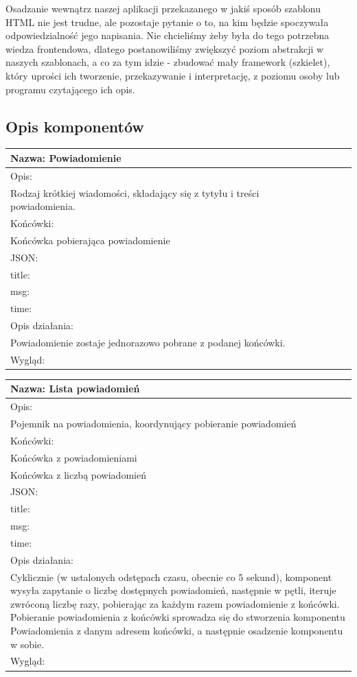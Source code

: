 \documentclass[licencjacka]{pracamgr}
\begin{document}
Osadzanie wewnątrz naszej aplikacji przekazanego w jakiś sposób szablonu HTML nie jest trudne, ale pozostaje pytanie o to,
na kim będzie spoczywała odpowiedzialność jego napisania. Nie chcieliśmy
żeby była do tego potrzebna wiedza frontendowa,
dlatego postanowiliśmy zwiększyć poziom abstrakcji w naszych szablonach,
a co za tym idzie - zbudować mały framework (szkielet),
który uprości ich tworzenie, przekazywanie i interpretację, z poziomu osoby lub programu czytającego ich opis.

\subsection{Opis komponentów}
\begin{tabularx}{\linewidth}{|l|l|c|X|l|}\hline
Nazwa:
Powiadomienie
\\\hline
Opis:\\

Rodzaj krótkiej wiadomości, składający się z tytyłu i treści powiadomienia.\\\hline
Końcówki:\\
Końcówka pobierająca powiadomienie\\\hline
JSON: \\
title: \\
msg:\\
time:\\\hline
Opis działania:\\
Powiadomienie zostaje jednorazowo pobrane z podanej końcówki.\\\hline
Wygląd:\\\hline
\end{tabularx}

\begin{tabularx}{\linewidth}{|l}\hline
Nazwa:
Lista powiadomień
\\\hline
Opis:\\

Pojemnik na powiadomienia, koordynujący pobieranie powiadomień\\\hline
Końcówki:\\
Końcówka z powiadomieniami\\
Końcówka z liczbą powiadomień
\\\hline
JSON: \\
title: \\
msg:\\
time:\\\hline
Opis działania:\\
Cyklicznie (w ustalonych odstępach czasu, obecnie co 5 sekund), komponent
wysyła zapytanie o liczbę dostępnych powiadomień, następnie w pętli, iteruje zwróconą liczbę razy,
pobierając za każdym razem powiadomienie z końcówki. Pobieranie powiadomienia z końcówki sprowadza się
do stworzenia komponentu Powiadomienia z danym adresem końcówki, a następnie osadzenie komponentu w sobie.\\\hline
Wygląd:\\\hline
\end{tabularx}
\end{document}
